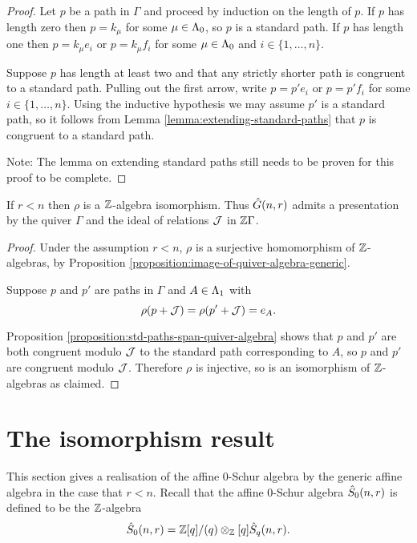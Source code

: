 \documentclass[a4paper, 11pt]{report}
\begin{document}
\begin{proof}
Let $p$ be a path in $\Gamma$ and proceed by induction on the length of $p$. If $p$ has length zero then $p=k_\mu$ for some $\mu\in\Lambda_0{}$, so $p$ is a standard path. If $p$ has length one then $p=k_\mu e_i$ or $p=k_\mu f_i$ for some $\mu\in\Lambda_0{}$ and $i\in\{1,\ldots,n\}$.

Suppose $p$ has length at least two and that any strictly shorter path is congruent to a standard path. Pulling out the first arrow, write $p=p'e_i$ or $p=p'f_i$ for some $i\in\{1,\ldots,n\}$. Using the inductive hypothesis we may assume $p'$ is a standard path, so it follows from Lemma \ref{lemma:extending-standard-paths} that $p$ is congruent to a standard path.

{\color{red}
Note: The lemma on extending standard paths still needs to be proven for this proof to be complete.}
\end{proof}

\begin{theorem}\label{theorem:presentation-generic-algebra}
If $r<n$ then $\rho$ is a $\mathbb{Z}$-algebra isomorphism. Thus $\hat{G}(n,r)$ admits a presentation by the quiver $\Gamma$ and the ideal of relations $\mathcal{J}$ in $\mathbb{Z}\Gamma$.
\end{theorem}

\begin{proof}
Under the assumption $r<n$, $\rho$ is a surjective homomorphism of $\mathbb{Z}$-algebras, by Proposition \ref{proposition:image-of-quiver-algebra-generic}.

Suppose $p$ and $p'$ are paths in $\Gamma$ and $A\in\Lambda_1{}$ with
\begin{equation*}
\rho(p+\mathcal{J}) = \rho(p'+\mathcal{J}) = e_A.
\end{equation*}

Proposition \ref{proposition:std-paths-span-quiver-algebra} shows that $p$ and $p'$ are both congruent modulo $\mathcal{J}$ to the standard path corresponding to $A$, so $p$ and $p'$ are congruent modulo $\mathcal{J}$. Therefore $\rho$ is injective, so is an isomorphism of $\mathbb{Z}$-algebras as claimed. 
\end{proof}


\section{The isomorphism result}

This section gives a realisation of the affine $0$-Schur algebra by the generic affine algebra in the case that $r<n$. Recall that the affine $0$-Schur algebra $\hat{S}_0(n,r)$ is defined to be the $\mathbb{Z}$-algebra
\begin{equation*}
\hat{S}_0(n,r) = \mathbb{Z}[q]/{(q)}\otimes_{\mathbb{Z}}[q]\hat{S}_q(n,r).
\end{equation*}
\end{document}
